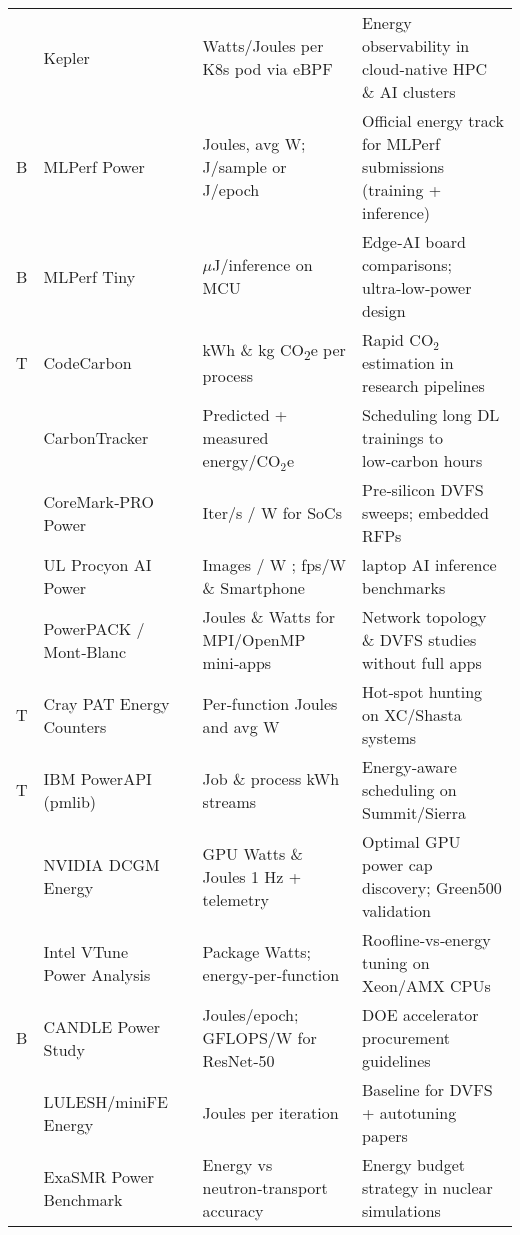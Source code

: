 \begin{table*}[hptb]
\begin{tabularx}{0.25\textwidth}{|p{}p{}p{}|}
   & Kepler  & \cite{kepler}                            & Watts/Joules per K8s pod via eBPF & Energy observability in cloud‑native HPC \& AI clusters \\  
   B & MLPerf Power  & \cite{mlperfpower}                & Joules, avg W; J/sample or J/epoch & Official energy track for MLPerf submissions (training + inference) \\  
   B & MLPerf Tiny  & \cite{mlperftiny}                  & $\mu$J/inference on MCU & Edge‑AI board comparisons; ultra‑low‑power design \\  
   T & CodeCarbon  & \cite{codecarbon}                   & kWh
    \& kg CO\textsubscript{2}e per process & Rapid CO$_2$ estimation in research pipelines \\  
   & CarbonTracker  & \cite{carbontracker}             & Predicted + measured energy/CO$_2$e & Scheduling long DL trainings to low‑carbon hours \\  
   & CoreMark‑PRO Power  & \cite{coremarkpro}          & Iter/s / W for SoCs & Pre‑silicon DVFS sweeps; embedded RFPs \\  
   & UL Procyon AI Power  & \cite{procyon}             & Images / W ; fps/W \& Smartphone & laptop AI inference benchmarks \\  
   & PowerPACK / Mont‑Blanc  & \cite{powerpackmontbl}  & Joules \& Watts for MPI/OpenMP mini‑apps & Network topology \& DVFS studies without full apps \\  
   T & Cray PAT Energy Counters  & \cite{craypatenergyco}& Per‑function Joules and avg W & Hot‑spot hunting on XC/Shasta systems \\  
   T & IBM PowerAPI (pmlib)  & \cite{ibmpowerapipmli}    & Job \& process kWh streams & Energy‑aware scheduling on Summit/Sierra \\  
   & NVIDIA DCGM Energy  & \cite{nvidiadcgmenerg}      & GPU Watts \& Joules \@ 1 Hz + telemetry & Optimal GPU power cap discovery; Green500 validation \\  
   & Intel VTune Power Analysis  & \cite{intelvtunepower}& Package Watts; energy‑per‑function & Roofline‑vs‑energy tuning on Xeon/AMX CPUs \\  
   B & CANDLE Power Study  & \cite{candlepowerstud}      & Joules/epoch; GFLOPS/W for ResNet‑50 & DOE accelerator procurement guidelines \\  
   & LULESH/miniFE Energy  & \cite{luleshminifeene}    & Joules per iteration & Baseline for DVFS + autotuning papers \\  
   & ExaSMR Power Benchmark  & \cite{exasmrpowerbenc}  & Energy vs neutron‑transport accuracy & Energy budget strategy in nuclear simulations \\  

\end{tabularx}
\end{table*}
